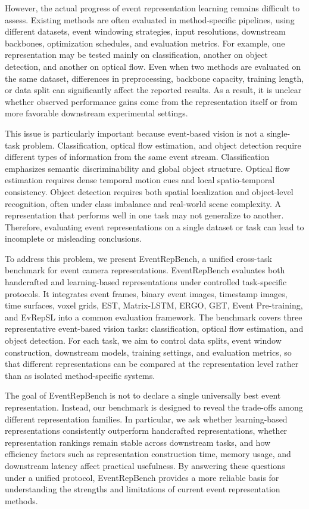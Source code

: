 \documentclass[letterpaper]{article}
\begin{document}
However, the actual progress of event representation learning remains difficult to assess. Existing methods are often evaluated in method-specific pipelines, using different datasets, event windowing strategies, input resolutions, downstream backbones, optimization schedules, and evaluation metrics. For example, one representation may be tested mainly on classification, another on object detection, and another on optical flow. Even when two methods are evaluated on the same dataset, differences in preprocessing, backbone capacity, training length, or data split can significantly affect the reported results. As a result, it is unclear whether observed performance gains come from the representation itself or from more favorable downstream experimental settings.

This issue is particularly important because event-based vision is not a single-task problem. Classification, optical flow estimation, and object detection require different types of information from the same event stream. Classification emphasizes semantic discriminability and global object structure. Optical flow estimation requires dense temporal motion cues and local spatio-temporal consistency. Object detection requires both spatial localization and object-level recognition, often under class imbalance and real-world scene complexity. A representation that performs well in one task may not generalize to another. Therefore, evaluating event representations on a single dataset or task can lead to incomplete or misleading conclusions.

To address this problem, we present EventRepBench, a unified cross-task benchmark for event camera representations. EventRepBench evaluates both handcrafted and learning-based representations under controlled task-specific protocols. It integrates event frames, binary event images, timestamp images, time surfaces, voxel grids, EST, Matrix-LSTM, ERGO, GET, Event Pre-training, and EvRepSL into a common evaluation framework. The benchmark covers three representative event-based vision tasks: classification, optical flow estimation, and object detection. For each task, we aim to control data splits, event window construction, downstream models, training settings, and evaluation metrics, so that different representations can be compared at the representation level rather than as isolated method-specific systems.

The goal of EventRepBench is not to declare a single universally best event representation. Instead, our benchmark is designed to reveal the trade-offs among different representation families. In particular, we ask whether learning-based representations consistently outperform handcrafted representations, whether representation rankings remain stable across downstream tasks, and how efficiency factors such as representation construction time, memory usage, and downstream latency affect practical usefulness. By answering these questions under a unified protocol, EventRepBench provides a more reliable basis for understanding the strengths and limitations of current event representation methods.
\end{document}
